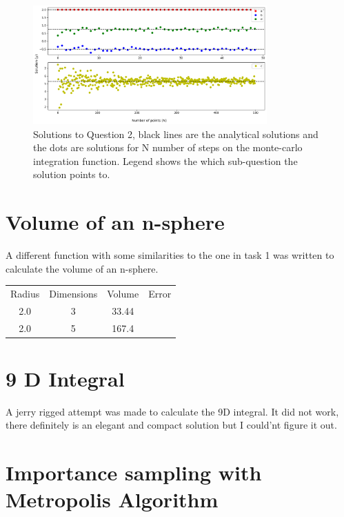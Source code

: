 \documentclass{article}
\begin{document}
\begin{figure}[H]
    \centering
    \includegraphics[width=0.8\textwidth]{q-2.png}
    \caption{Solutions to Question 2, black lines are the analytical solutions and the dots are 
    solutions for N number of steps on the monte-carlo integration function. Legend shows the 
    which sub-question the solution points to.}
    \label{fig:q-2}
 \end{figure}

\section{Volume of an n-sphere}
A different function with some similarities to the one in task 1 was written to calculate
the volume of an n-sphere.

\begin{table}[H]
    \centering
    \begin{tabular}{cccc}
    \multicolumn{1}{l}{Radius} & \multicolumn{1}{l}{Dimensions} & \multicolumn{1}{l}{Volume} & \multicolumn{1}{l}{Error} \\
    2.0                          & 3                              & 33.44                      &                           \\
    2.0                          & 5                              & 167.4                      &                          
    \end{tabular}
    \end{table}


\section{9 D Integral}
A jerry rigged attempt was made to calculate the 9D integral. It did not work, there definitely
is an elegant and compact solution but I could'nt figure it out.

\section{Importance sampling with Metropolis Algorithm}
\end{document}
